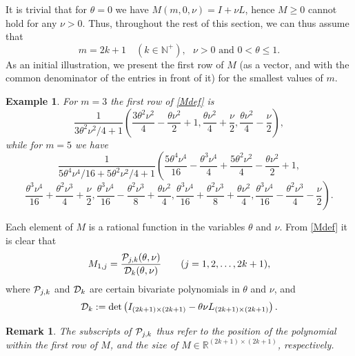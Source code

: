 \documentclass[a4paper]{article}
\newtheorem{remark}{Remark}
\newtheorem{example}{Example}
\newcommand{\te}{\theta}
\newcommand{\nplus}{\mathbb{N}^+}
\newcommand{\cP}{{\cal{P}}}
\newcommand{\cD}{{\cal{D}}}
\begin{document}
It is trivial that for $\te=0$ we have $M(m,0,\nu)=I+\nu L$, hence $M\ge 0$ cannot hold for any $\nu>0$. Thus, throughout the rest of this section, we can thus assume that 
\begin{equation}\label{genassump}
\boxed{ 
m=2k+1\quad (k\in\nplus), \ \ \ \nu>0 \text{\ \  and\ \  } 0<\te\le 1.}
\end{equation}
As an initial illustration, we present the first row of $M$ (as a vector, and with the common denominator of the entries in front of it) for the smallest values of $m$. 
\begin{example}\label{example1} 
For $m=3$ the first row of \eqref{Mdef} is 
\[
\frac{1}{{3 \theta ^2 \nu ^2}/{4}+1}\left(\frac{3 \theta ^2 \nu ^2}{4}-\frac{\theta  \nu ^2}{2}+1,\frac{\theta  \nu ^2}{4}+\frac{\nu }{2},\frac{\theta  \nu ^2}{4}-\frac{\nu }{2}\right),
\]
while for $m=5$ we have 
\[
\frac{1}{{5 \theta ^4 \nu ^4}/{16}+{5 \theta ^2 \nu ^2}/{4}+1}\left(\frac{5 \theta ^4 \nu ^4}{16}-\frac{\theta ^3 \nu ^4}{4}+\frac{5 \theta ^2 \nu ^2}{4}-\frac{\theta  \nu ^2}{2}+1,\right.
\]
\[
\left.\frac{\theta ^3 \nu
   ^4}{16}+\frac{\theta ^2 \nu ^3}{4}+\frac{\nu }{2},\frac{\theta ^3 \nu ^4}{16}-\frac{\theta ^2 \nu ^3}{8}+\frac{\theta  \nu ^2}{4},\frac{\theta ^3
   \nu ^4}{16}+\frac{\theta ^2 \nu ^3}{8}+\frac{\theta  \nu ^2}{4},\frac{\theta ^3 \nu ^4}{16}-\frac{\theta ^2 \nu ^3}{4}-\frac{\nu }{2}\right).
\]

\end{example}


Each element of $M$ is a rational function in the variables $\te$ and $\nu$. From \eqref{Mdef} it is clear that 
\begin{equation}\label{M1jPjkDk}
M_{1,j}=\frac{\cP_{j,k}(\te,\nu) }{\cD_k(\te,\nu)}\quad\quad(j=1,2,\ldots,2k+1),
\end{equation}
where $\cP_{j,k}$ and $\cD_{k}$ are certain bivariate polynomials in $\te$ and $\nu$, and 
\begin{equation}\label{dendet}
\cD_k:=\det\left(I_{(2k+1)\times(2k+1)}-\te\nu L_{(2k+1)\times(2k+1)}\right).
\end{equation}
\begin{remark}
The subscripts of $\cP_{j,k}$ thus refer to the position of the polynomial within the first row of $M$, and the size of $M\in\mathbb{R}^{(2k+1)\times(2k+1)}$, respectively.
\end{remark}
\end{document}
